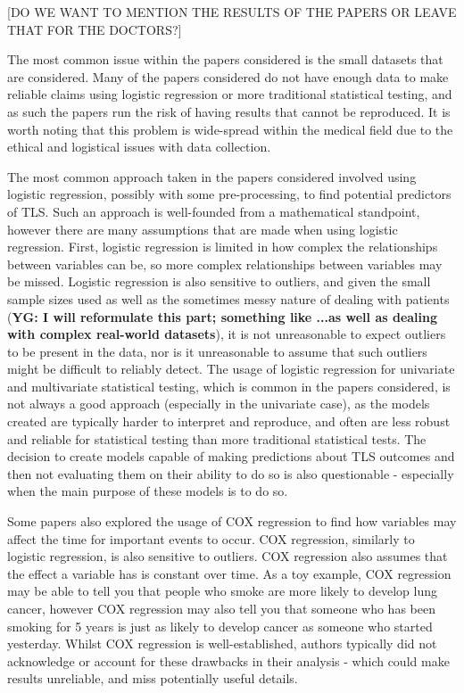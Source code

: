\documentclass{article}
\begin{document}
[DO WE WANT TO MENTION THE RESULTS OF THE PAPERS OR LEAVE THAT FOR THE DOCTORS?]

The most common issue within the papers considered is the small datasets that are considered. Many of the papers considered do not have enough data to make reliable claims using logistic regression or more traditional statistical testing, and as such the papers run the risk of having results that cannot be reproduced. It is worth noting that this problem is wide-spread within the medical field due to the ethical and logistical issues with data collection.

The most common approach taken in the papers considered involved using logistic regression, possibly with some pre-processing, to find potential predictors of TLS. Such an approach is well-founded from a mathematical standpoint, however there are many assumptions that are made when using logistic regression. First, logistic regression is limited in how complex the relationships between variables can be, so more complex relationships between variables may be missed. Logistic regression is also sensitive to outliers, and given the small sample sizes used as well as the sometimes messy nature of dealing with patients (\textbf{YG: I will reformulate this part; something like ...as well as dealing with complex real-world datasets}), it is not unreasonable to expect outliers to be present in the data, nor is it unreasonable to assume that such outliers might be difficult to reliably detect. The usage of logistic regression for univariate and multivariate statistical testing, which is common in the papers considered, is not always a good approach (especially in the univariate case), as the models created are typically harder to interpret and reproduce, and often are less robust and reliable for statistical testing than more traditional statistical tests. The decision to create models capable of making predictions about TLS outcomes and then not evaluating them on their ability to do so is also questionable - especially when the main purpose of these models is to do so.

Some papers also explored the usage of COX regression to find how variables may affect the time for important events to occur. COX regression, similarly to logistic regression, is also sensitive to outliers. COX regression also assumes that the effect a variable has is constant over time. As a toy example, COX regression may be able to tell you that people who smoke are more likely to develop lung cancer, however COX regression may also tell you that someone who has been smoking for 5 years is just as likely to develop cancer as someone who started yesterday. Whilst COX regression is well-established, authors typically did not acknowledge or account for these drawbacks in their analysis - which could make results unreliable, and miss potentially useful details.
\end{document}
